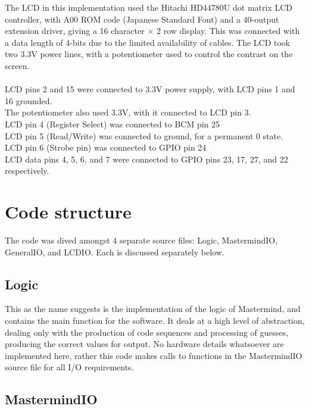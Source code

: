 \documentclass[a4paper, titlepage]{article}
\begin{document}
The LCD in this implementation used the Hitachi HD44780U dot matrix LCD controller, with A00 ROM code (Japanese Standard Font) and a 40-output extension driver, giving a 16 character $\times$ 2 row display. This was connected with a data length of 4-bits due to the limited availability of cables. The LCD took two 3.3V power lines, with a potentiometer used to control the contrast on the screen. 
\\
\\
LCD pins 2 and 15 were connected to 3.3V power supply, with LCD pins 1 and 16 grounded.\\
The potentiometer also used 3.3V, with it connected to LCD pin 3.\\
LCD pin 4 (Register Select) was connected to BCM pin 25\\
LCD pin 5 (Read/Write) was connected to ground, for a permanent 0 state.\\
LCD pin 6 (Strobe pin) was connected to GPIO pin 24 \\
LCD data pins 4, 5, 6, and 7 were connected to GPIO pins 23, 17, 27, and 22 respectively.\\

\section{Code structure}

The code was dived amongst 4 separate source files: Logic, MastermindIO, GeneralIO, and LCDIO. Each is discussed separately below.

\subsection{Logic}

This as the name suggests is the implementation of the logic of Mastermind, and contains the main function for the software. It deals at a high level of abstraction, dealing only with the production of code sequences and processing of guesses, producing the correct values for output. No hardware details whatsoever are implemented here, rather this code makes calls to functions in the MastermindIO source file for all I/O requirements.

\subsection{MastermindIO}
\end{document}
